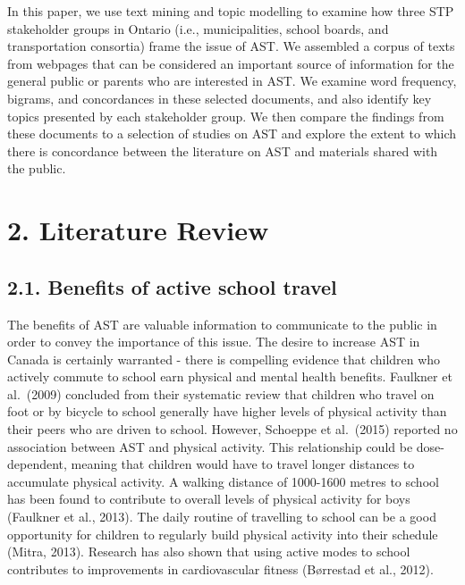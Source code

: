 \documentclass[]{elsarticle} %
\begin{document}
In this paper, we use text mining and topic modelling to examine how
three STP stakeholder groups in Ontario (i.e., municipalities, school
boards, and transportation consortia) frame the issue of AST. We
assembled a corpus of texts from webpages that can be considered an
important source of information for the general public or parents who
are interested in AST. We examine word frequency, bigrams, and
concordances in these selected documents, and also identify key topics
presented by each stakeholder group. We then compare the findings from
these documents to a selection of studies on AST and explore the extent
to which there is concordance between the literature on AST and
materials shared with the public.

\hypertarget{literature-review}{%
\section{2. Literature Review}\label{literature-review}}

\hypertarget{benefits-of-active-school-travel}{%
\subsection{2.1. Benefits of active school
travel}\label{benefits-of-active-school-travel}}

The benefits of AST are valuable information to communicate to the
public in order to convey the importance of this issue. The desire to
increase AST in Canada is certainly warranted - there is compelling
evidence that children who actively commute to school earn physical and
mental health benefits. Faulkner et al.~(2009) concluded from their
systematic review that children who travel on foot or by bicycle to
school generally have higher levels of physical activity than their
peers who are driven to school. However, Schoeppe et al.~(2015) reported
no association between AST and physical activity. This relationship
could be dose-dependent, meaning that children would have to travel
longer distances to accumulate physical activity. A walking distance of
1000-1600 metres to school has been found to contribute to overall
levels of physical activity for boys (Faulkner et al., 2013). The daily
routine of travelling to school can be a good opportunity for children
to regularly build physical activity into their schedule (Mitra, 2013).
Research has also shown that using active modes to school contributes to
improvements in cardiovascular fitness (Børrestad et al., 2012).
\end{document}
